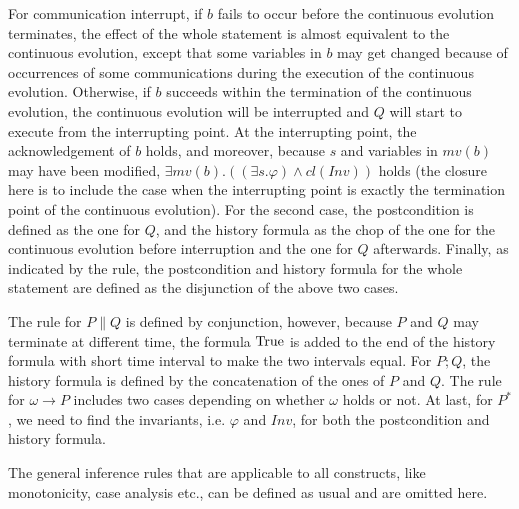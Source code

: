 \documentclass{llncs}
\newcommand{\ltrue}{\textmd{True}}
\newcommand{\close}[1]{cl(#1)}
\newcommand{\Pre}{\varphi}
\begin{document}
For communication interrupt,
if $b$ fails to occur before the continuous evolution terminates,
the effect of the whole statement is almost equivalent to  the continuous  evolution,
except that some variables in $b$ may get changed because of occurrences of some communications
during the execution of the continuous  evolution.
Otherwise, if $b$ succeeds within the termination of the continuous  evolution,
the continuous evolution will be interrupted and $Q$ will start to execute from the interrupting point.
At the interrupting point, the acknowledgement of $b$ holds, and moreover,
because  $s$ and  variables in $mv(b)$ may have been modified,
$\exists mv(b). ((\exists s. \Pre) \wedge \close{Inv})$  holds (the closure here is to
include the case when the interrupting point is exactly the termination point of the continuous  evolution).
For the second case, the postcondition
is  defined as the one for $Q$, and the history formula as the chop of the one for
the continuous evolution before interruption and the one for $Q$ afterwards.
Finally, as indicated by the rule, the postcondition and history formula for the whole statement are defined as the disjunction of the above two cases.



The rule for $P\|Q$ is defined by conjunction, however, because
$P$ and $Q$ may terminate at different time,
the formula $\ltrue$ is added to the end of the history formula with short time interval to make
the two intervals equal. For $P;Q$, the history formula is defined by the concatenation of the ones
of $P$ and $Q$. The rule for $\omega \rightarrow P$ includes two cases depending on whether
$\omega$ holds or not.
At last, for $P^*$, we need to find the invariants, i.e. $\Pre$ and $Inv$,  for both the postcondition and history formula.

The general inference rules that are applicable to all constructs, like monotonicity, case analysis etc.,
can be defined as usual and are omitted here.
\end{document}
